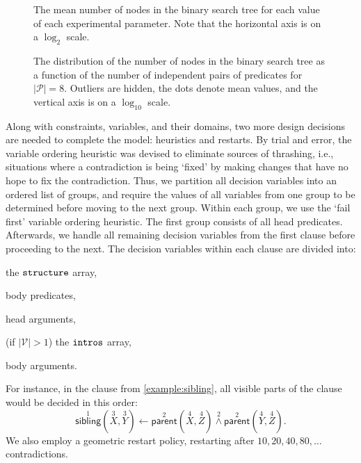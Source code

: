 \documentclass[letterpaper]{article}
\theoremstyle{definition}
\newcommand{\variable}[1]{\texttt{\textup{#1}}}
\newcommand{\predicates}{\mathcal{P}}
\newcommand{\variables}{\mathcal{V}}
\begin{document}
\begin{figure}
  \centering
  
  \caption{The mean number of nodes in the binary search tree for each value of
    each experimental parameter. Note that the horizontal axis is on a $\log_2$
    scale.}
  \label{fig:impact}
\end{figure}

\begin{figure*}
  \centering
  
  \caption{The distribution of the number of nodes in the binary search tree as
    a function of the number of independent pairs of predicates for
    $|\predicates| = 8$. Outliers are hidden, the dots denote mean values, and
    the vertical axis is on a $\log_{10}$ scale.}
  \label{fig:phase_transition}
\end{figure*}

Along with constraints, variables, and their domains, two more design decisions
are needed to complete the model: heuristics and restarts. By trial and error,
the variable ordering heuristic was devised to eliminate sources of thrashing,
i.e., situations where a contradiction is being `fixed' by making changes that
have no hope to fix the contradiction. Thus, we partition all decision variables
into an ordered list of groups, and require the values of all variables from one
group to be determined before moving to the next group. Within each group, we
use the `fail first' variable ordering heuristic. The first group consists of
all head predicates. Afterwards, we handle all remaining decision variables from
the first clause before proceeding to the next. The decision variables within
each clause are divided into:
\begin{enumerate*}
\item the $\variable{structure}$ array,
\item body predicates,
\item head arguments,
\item (if $|\variables{}| > 1$) the $\variable{intros}$ array,
\item body arguments.
\end{enumerate*}
For instance, in the clause from \cref{example:sibling}, all visible parts of
the clause would be decided in this order:
\[
  \overset{1}{\mathsf{sibling}}(\overset{3}{X}, \overset{3}{Y}) \gets
  \overset{2}{\mathsf{parent}}(\overset{4}{X}, \overset{4}{Z})
  \overset{2}{\land} \overset{2}{\mathsf{parent}}(\overset{4}{Y},
  \overset{4}{Z}).
\]
We also employ a geometric restart policy, restarting after $10, 20, 40,
80, \dots$ contradictions.
\end{document}
